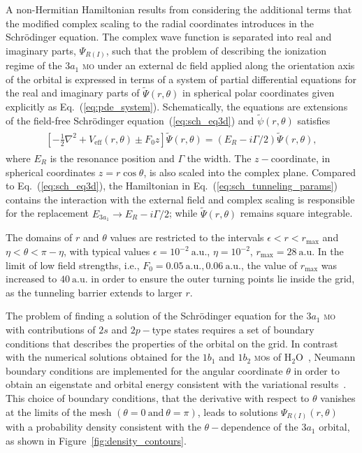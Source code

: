 A non-Hermitian Hamiltonian results from considering the additional
terms that the modified complex scaling to the radial coordinates
introduces in the Schr\"{o}dinger equation. The complex wave function
is separated into real and imaginary parts, $\Psi_{R(I)}$, such that
the problem of describing the ionization regime of the $3a_{1}$
\textsc{mo} under an external dc field applied along the orientation
axis of the orbital is expressed in terms of a system of partial
differential equations for the real and imaginary parts of
$\widetilde{\Psi}(r,\theta)$ in spherical polar coordinates given
explicitly as Eq.~(\ref{eq:pde_system}). Schematically, the equations
are extensions of the field-free Schr\"{o}dinger
equation~(\ref{eq:sch_eq3d}) and $\widetilde{\psi}(r,\theta)$
satisfies~\cite{sarias_2017}
%
\begin{eqnarray}
  \begin{split}
    \left[ -\frac{1}{2}\nabla^{2} + V_{\mathrm{eff}}(r, \theta)
      \pm F_{0}z \right] \widetilde{\Psi}(r,\theta) = (E_{R} - i\Gamma/2)
    \widetilde{\Psi}(r, \theta),
  \end{split}
  \label{eq:sch_tunneling_params}
\end{eqnarray}
%
where $E_{R}$ is the resonance position and $\Gamma$ the width. The
$z-$coordinate, in spherical coordinates $z = r\cos\theta$, is also
scaled into the complex plane. Compared to Eq.~(\ref{eq:sch_eq3d}),
the Hamiltonian in Eq.~(\ref{eq:sch_tunneling_params}) contains the
interaction with the external field and complex scaling is responsible
for the replacement $E_{3a_{1}} \to E_{R} - i\Gamma/2$; while
$\widetilde{\Psi}(r, \theta)$ remains square integrable.

The domains of $r$ and $\theta$ values are restricted to the intervals
$\epsilon < r < r_{\mathrm{max}}$ and $\eta < \theta < \pi - \eta$,
with typical values $\epsilon = 10^{-2}\ \mathrm{a.u.}$, $\eta =
10^{-2}$, $r_{\mathrm{max}} = 28\ \mathrm{a.u.}$ In the limit of low
field strengths, i.e., $F_{0} = 0.05\ \mathrm{a.u.},
0.06\ \mathrm{a.u.}$, the value of $r_{\mathrm{max}}$ was increased to
$40\ \mathrm{a.u.}$ in order to ensure the outer turning points lie
inside the grid, as the tunneling barrier extends to larger $r$.

The problem of finding a solution of the Schr\"{o}dinger equation for
the $3a_{1}$ \textsc{mo} with contributions of $2s$ and $2p-$type
states requires a set of boundary conditions that describes the
properties of the orbital on the grid. In contrast with the numerical
solutions obtained for the $1b_{1}$ and $1b_{2}$ \textsc{mo}s of
H$_{2}$O~\cite{sarias_2016}, Neumann boundary conditions are
implemented for the angular coordinate $\theta$ in order to obtain an
eigenstate and orbital energy consistent with the variational
results~\cite{Moccia_1964}. This choice of boundary conditions, that
the derivative with respect to $\theta$ vanishes at the limits of the
mesh $(\theta = 0 ~\mathrm{and}~ \theta = \pi)$, leads to solutions
$\Psi_{R(I)}(r,\theta)$ with a probability density consistent with the
$\theta-$dependence of the $3a_{1}$ orbital, as shown in
Figure~\ref{fig:density_contours}.



